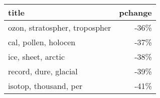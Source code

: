 \begin{tabular}{p{1.2cm}r}
\toprule
                         title &  pchange \\
\midrule
 ozon, stratospher, tropospher &     -36\% \\
          cal, pollen, holocen &     -37\% \\
            ice, sheet, arctic &     -38\% \\
         record, dure, glacial &     -39\% \\
         isotop, thousand, per &     -41\% \\
\bottomrule
\end{tabular}
